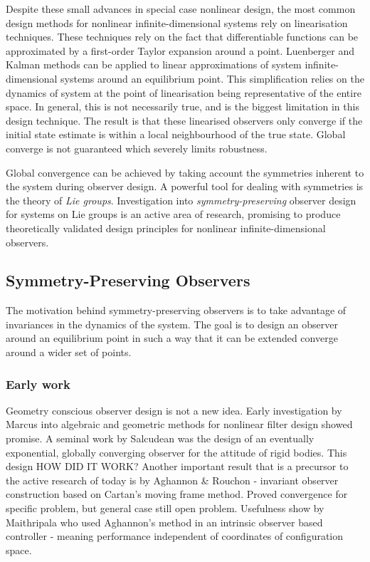 Despite these small advances in special case nonlinear design, the most common design methods for nonlinear infinite-dimensional systems rely on linearisation techniques. These techniques rely on the fact that differentiable functions can be approximated by a first-order Taylor expansion around a point. Luenberger and Kalman methods can be applied to linear approximations of system infinite-dimensional systems around an equilibrium point. This simplification relies on the dynamics of system at the point of linearisation being representative of the entire space. In general, this is not necessarily true, and is the biggest limitation in this design technique. The result is that these linearised observers only converge if the initial state estimate is within a local neighbourhood of the true state. Global converge is not guaranteed which severely limits robustness.

Global convergence can be achieved by taking account the symmetries inherent to the system during observer design. A powerful tool for dealing with symmetries is the theory of \textit{Lie groups}. Investigation into \textit{symmetry-preserving} observer design for systems on Lie groups is an active area of research, promising to produce theoretically validated design principles for nonlinear infinite-dimensional observers.

\subsection{Symmetry-Preserving Observers}
The motivation behind symmetry-preserving observers is to take advantage of invariances in the dynamics of the system. The goal is to design an observer around an equilibrium point in such a way that it can be extended converge around a wider set of points.

\subsubsection{Early work}
Geometry conscious observer design is not a new idea. Early investigation by Marcus \cite{marcus1984algebraic} into algebraic and geometric methods for nonlinear filter design showed promise.
A seminal work by Salcudean \cite{salcudean1991globally} was the design of an eventually exponential, globally converging observer for the attitude of rigid bodies. This design HOW DID IT WORK?
Another important result that is a precursor to the active research of today is by Aghannon \& Rouchon \cite{aghannan2002invariant} - invariant observer construction based on Cartan's moving frame method. Proved convergence for specific problem, but general case still open problem.
Usefulness show by Maithripala \cite{maithripala2005intrinsic} who used Aghannon's method in an intrinsic observer based controller - meaning performance independent of coordinates of configuration space.

